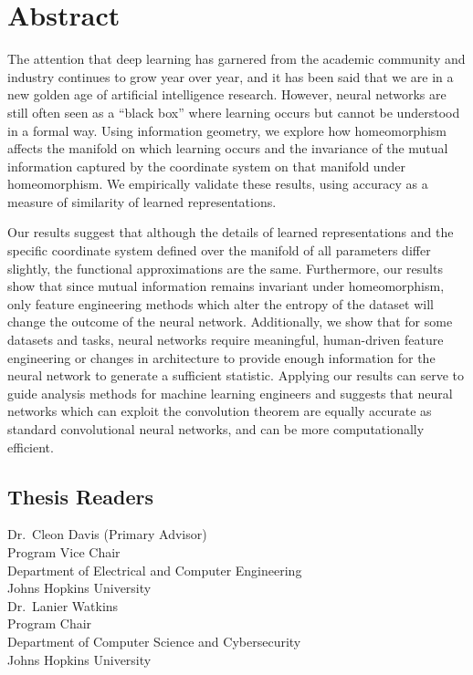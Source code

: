 \chapter*{Abstract}
%
The attention that deep learning has garnered from the academic community and industry continues to grow year over year, and it has been said that we are in a new golden age of artificial intelligence research.
However, neural networks are still often seen as a ``black box'' where learning occurs but cannot be understood in a formal way.
Using information geometry, we explore how homeomorphism affects the manifold on which learning occurs and the invariance of the mutual information captured by the coordinate system on that manifold under homeomorphism.
We empirically validate these results, using accuracy as a measure of similarity of learned representations.

Our results suggest that although the details of learned representations and the specific coordinate system defined over the manifold of all parameters differ slightly, the functional approximations are the same.
Furthermore, our results show that since mutual information remains invariant under homeomorphism, only feature engineering methods which alter the entropy of the dataset will change the outcome of the neural network.
Additionally, we show that for some datasets and tasks, neural networks require meaningful, human-driven feature engineering or changes in architecture to provide enough information for the neural network to generate a sufficient statistic.
Applying our results can serve to guide analysis methods for machine learning engineers and suggests that neural networks which can exploit the convolution theorem are equally accurate as standard convolutional neural networks, and can be more computationally efficient.
%
\section*{Thesis Readers}
\begin{singlespace}
%
\noindent Dr.~Cleon Davis (Primary Advisor)\\
\indent \indent Program Vice Chair\\
\indent \indent Department of Electrical and Computer Engineering\\
\indent \indent Johns Hopkins University\\

\noindent Dr.~Lanier Watkins\\
\indent \indent Program Chair\\
\indent \indent Department of Computer Science and Cybersecurity\\
\indent \indent Johns Hopkins University\\
\end{singlespace}